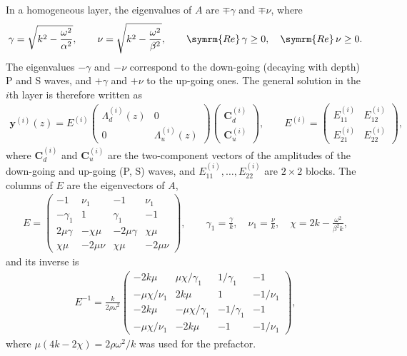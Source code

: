 \documentclass[a4paper, 10pt]{article}
\begin{document}
In a homogeneous layer, the eigenvalues of $A$ are $\mp\gamma$ and $\mp\nu$, where
\begin{align}
  \gamma = \sqrt{k^2 - \frac{\omega^2}{\alpha^2}}, \qquad
  \nu = \sqrt{k^2 - \frac{\omega^2}{\beta^2}}, \qquad
  \symrm{Re}\,\gamma \geq 0, \quad \symrm{Re}\,\nu \geq 0.
\end{align}
The eigenvalues $-\gamma$ and $-\nu$ correspond to the down-going (decaying with depth) P and S waves, and $+\gamma$ and $+\nu$ to the up-going ones.
The general solution in the $i$th layer is therefore written as
\begin{align}
  \symbf{y}^{(i)}(z) =
  E^{(i)}
  \begin{pmatrix}
    \Lambda_d^{(i)}(z) & 0 \\
    0 & \Lambda_u^{(i)}(z)
  \end{pmatrix}
  \begin{pmatrix}
    \symbf{C}_d^{(i)} \\
    \symbf{C}_u^{(i)}
  \end{pmatrix},
  \qquad
  E^{(i)} =
  \begin{pmatrix}
    E_{11}^{(i)} & E_{12}^{(i)} \\
    E_{21}^{(i)} & E_{22}^{(i)}
  \end{pmatrix},
  \label{e:layer_solution}
\end{align}
where $\symbf{C}_d^{(i)}$ and $\symbf{C}_u^{(i)}$ are the two-component vectors of the amplitudes of the down-going and up-going (P, S) waves, and $E_{11}^{(i)}, \dots, E_{22}^{(i)}$ are $2 \times 2$ blocks.
The columns of $E$ are the eigenvectors of $A$,
\begin{align}
  E =
  \begin{pmatrix}
    -1 & \nu_1 & -1 & \nu_1 \\
    -\gamma_1 & 1 & \gamma_1 & -1 \\
    2 \mu \gamma & -\chi \mu & -2 \mu \gamma & \chi \mu \\
    \chi \mu & -2 \mu \nu & \chi \mu & -2 \mu \nu
  \end{pmatrix},
  \qquad
  \gamma_1 = \frac{\gamma}{k}, \quad
  \nu_1 = \frac{\nu}{k}, \quad
  \chi = 2k - \frac{\omega^2}{\beta^2 k},
\end{align}
and its inverse is
\begin{align}
  E^{-1} =
  \frac{k}{2 \rho \omega^2}
  \begin{pmatrix}
    -2 k \mu & \mu \chi / \gamma_1 & 1 / \gamma_1 & -1 \\
    -\mu \chi / \nu_1 & 2 k \mu & 1 & -1 / \nu_1 \\
    -2 k \mu & -\mu \chi / \gamma_1 & -1 / \gamma_1 & -1 \\
    -\mu \chi / \nu_1 & -2 k \mu & -1 & -1 / \nu_1
  \end{pmatrix},
\end{align}
where $\mu (4k - 2\chi) = 2 \rho \omega^2 / k$ was used for the prefactor.
\end{document}
